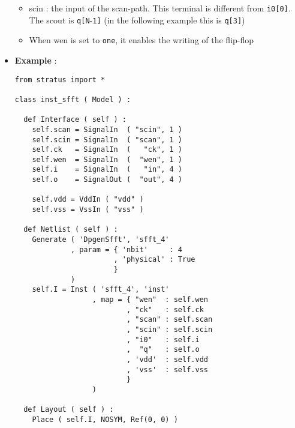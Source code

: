 \begin{itemize}
\begin{itemize}
        \item scin : the input of the scan-path. This terminal is different from \verb-i0[0]-. The scout is \verb-q[N--\verb-1]- (in the following example this is \verb-q[3]-)
        \item When wen is set to \verb-one-, it enables the writing of the flip-flop
    \end{itemize}
    \item \textbf{Example} :
\begin{verbatim}
from stratus import *

class inst_sfft ( Model ) :

  def Interface ( self ) :
    self.scan = SignalIn  ( "scin", 1 )
    self.scin = SignalIn  ( "scan", 1 )
    self.ck   = SignalIn  (   "ck", 1 )
    self.wen  = SignalIn  (  "wen", 1 )
    self.i    = SignalIn  (   "in", 4 )
    self.o    = SignalOut (  "out", 4 )

    self.vdd = VddIn ( "vdd" )
    self.vss = VssIn ( "vss" )
    
  def Netlist ( self ) :
    Generate ( 'DpgenSfft', 'sfft_4'
             , param = { 'nbit'     : 4
                       , 'physical' : True
                       }
             )
    self.I = Inst ( 'sfft_4', 'inst'
                  , map = { "wen"  : self.wen
                          , "ck"   : self.ck
                          , "scan" : self.scan
                          , "scin" : self.scin
                          , "i0"   : self.i
                          ,  "q"   : self.o
                          , 'vdd'  : self.vdd
                          , 'vss'  : self.vss
                          }
                  )
    
  def Layout ( self ) :
    Place ( self.I, NOSYM, Ref(0, 0) )
\end{verbatim}
\end{itemize}
